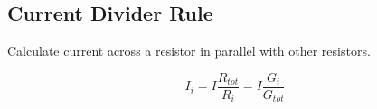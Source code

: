 
\subsection{Current Divider Rule} %
	
	Calculate current across a resistor in parallel with other resistors.
	
	\[
		I_i = I \frac{R_{tot}}{R_i} = I \frac{G_i}{G_{tot}}
	\]
	
